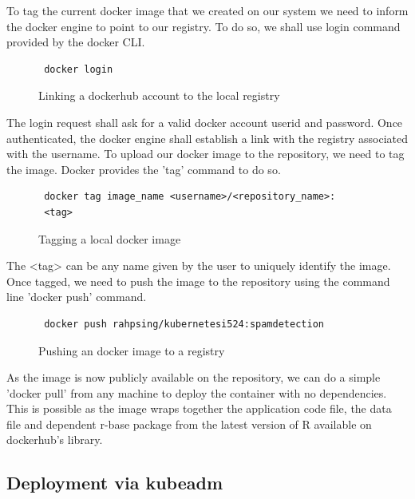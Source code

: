 \documentclass[9pt,twocolumn,twoside]{../../styles/osajnl}
\begin{document}
{\noindent
To tag the current docker image that we created on our system we need
to inform the docker engine to point to our registry. To do so, we
shall use login command provided by the docker CLI.

\begin{figure}[H]
\begin{verbatim}
 docker login
\end{verbatim}
\caption{Linking a dockerhub account to the local registry}
\label{Linking a dockerhub account to the local registry}
\end{figure}

\noindent
The login request shall ask for a valid docker account userid and
password. Once authenticated, the docker engine shall establish a link
with the registry associated with the username. To upload our docker
image to the repository, we need to tag the image. Docker provides the
'tag' command to do so.

\begin{figure}[H]
\begin{verbatim}
 docker tag image_name <username>/<repository_name>:
 <tag>
\end{verbatim}
\caption{Tagging a local docker image}
\label{Tagging a local docker image}
\end{figure}

\noindent
The <tag> can be any name given by the user to uniquely identify the
image. Once tagged, we need to push the image to the repository using
the command line 'docker push' command.

\begin{figure}[H]
\begin{verbatim}
 docker push rahpsing/kubernetesi524:spamdetection
\end{verbatim}
\caption{Pushing an docker image to a registry}
\label{Pushing an docker image to a registry}
\end{figure}

\noindent
As the image is now publicly available on the repository, we can do a
simple 'docker pull' from any machine to deploy the container with no
dependencies. This is possible as the image wraps together the
application code file, the data file and dependent r-base package from
the latest version of R available on dockerhub's library.

\subsection{Deployment via kubeadm}

}
\end{document}
